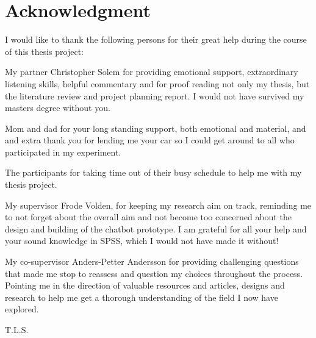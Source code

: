 \chapter*{Acknowledgment}
I would like to thank the following persons for their great help during the course of this thesis project:

\vspace{5mm}

My partner Christopher Solem for providing emotional support, extraordinary listening skills, helpful commentary and for proof reading not only my thesis, but the literature review and project planning report. I would not have survived my masters degree without you.

\vspace{5mm}

Mom and dad for your long standing support, both emotional and material, and and extra thank you for lending me your car so I could get around to all who participated in my experiment.

\vspace{5mm}

The participants for taking time out of their busy schedule to help me with my thesis project.

\vspace{5mm}

My supervisor Frode Volden, for keeping my research aim on track, reminding me to not forget about the overall aim and not become too concerned about the design and building of the chatbot prototype. I am grateful for all your help and your sound knowledge in SPSS, which I would not have made it without!

\vspace{5mm}

My co-supervisor Anders-Petter Andersson for providing challenging questions that made me stop to reassess and question my choices throughout the process. Pointing me in the direction of valuable resources and articles, designs and research to help me get a thorough understanding of the field I now have explored.

\begin{flushright}
T.L.S.\\[1pc]
\end{flushright}